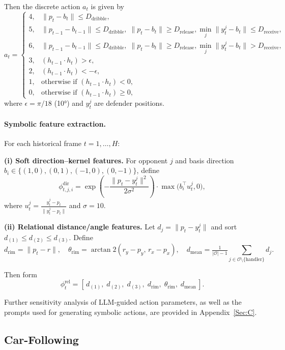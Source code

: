 \documentclass{article} %
\begin{document}
Then the discrete action $a_t$ is given by
\[
a_t =
\begin{cases}
4, & \|p_t - b_t\| \le D_{\text{dribble}}, \\
5, & \|p_{t-1} - b_{t-1}\|\le D_{\text{dribble}},\; \|p_t-b_t\|\ge D_{\text{release}}, \min_j \|y_t^j - b_t\|\le D_{\text{receive}}, \\
6, & \|p_{t-1} - b_{t-1}\|\le D_{\text{dribble}},\; \|p_t-b_t\|\ge D_{\text{release}}, \min_j \|y_t^j - b_t\| > D_{\text{receive}}, \\
3, & (h_{t-1}\cdot h_t) > \epsilon, \\
2, & (h_{t-1}\cdot h_t) < -\epsilon, \\
1, & \text{otherwise if } (h_{t-1}\cdot h_t) < 0, \\
0, & \text{otherwise if } (h_{t-1}\cdot h_t) \ge 0,
\end{cases}
\]
where $\epsilon = \pi/18$ (10°) and $y_t^j$ are defender positions.

\paragraph{Symbolic feature extraction.}
For each historical frame $t=1,\dots,H$:

\textbf{(i) Soft direction–kernel features.}  
For opponent $j$ and basis direction $b_i \in \{(1,0),(0,1),(-1,0),(0,-1)\}$, define
\[
\phi_{t,j,i}^{\text{dir}} = \exp\!\left(-\frac{\|p_t-y_t^j\|^2}{2\sigma^2}\right) \cdot \max\!\big(b_i^\top u_t^j, 0\big),
\]
where $u_t^j = \frac{y_t^j - p_t}{\|y_t^j - p_t\|}$ and $\sigma=10$.

\textbf{(ii) Relational distance/angle features.}  
Let $d_j = \|p_t - y_t^j\|$ and sort $d_{(1)} \le d_{(2)} \le d_{(3)}$. Define
\[
d_{\text{rim}} = \|p_t - r\|,\quad \theta_{\text{rim}} = \arctan2(r_y - p_y,\, r_x - p_x),\quad 
d_{\text{mean}} = \tfrac{1}{|\mathcal O| - 1}\sum_{j\in\mathcal O\setminus\{\text{handler}\}} d_j .
\]

Then form
\[
\phi_t^{\text{rel}} = [\,d_{(1)},\; d_{(2)},\; d_{(3)},\; d_{\text{rim}},\; \theta_{\text{rim}},\; d_{\text{mean}}\,].
\]

Further sensitivity analysis of LLM-guided action parameters, as well as the prompts used for generating symbolic actions, are provided in Appendix~\ref{Sec:C}.

\subsection{Car-Following}
\label{Sec:B3}
\end{document}
